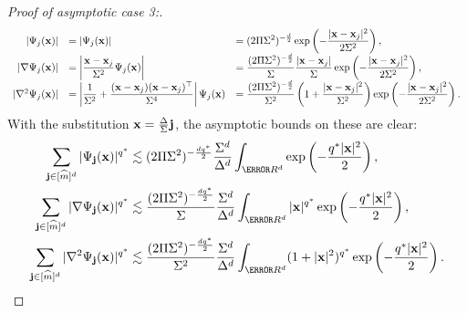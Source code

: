 \documentclass[10pt,a4paper,onecolumn]{article}
\numberwithin{equation}{section}
\renewcommand{\vec}{\mathbf}
\newcommand{\UCmath}[1]{%
	\begingroup
	\ucmathlist\uppercase\expandafter{#1}%
	\endgroup
}
\newcommand{\ucmathlist}{%
	\def\alpha{\mathrm{A}}%
	\def\beta{\mathrm{B}}%
	\let\gamma=\Gamma
	\let\delta=\Delta
	\def\epsilon{\mathrm{E}}%
	\def\varepsilon{\mathrm{E}}%
	\def\zeta{\mathrm{Z}}%
	\def\eta{\mathrm{H}}%
	\let\theta=\Theta
	\let\vartheta=\Theta
	\def\iota{\mathrm{I}}%
	\def\kappa{\mathrm{K}}%
	\let\lambda=\Lambda
	\def\mu{\mathrm{M}}%
	\def\nu{\mathrm{N}}%
	\let\xi=\Xi
	\let\pi=\Pi
	\let\varpi=\Pi
	\def\rho{\mathrm{P}}%
	\def\varrho{\mathrm{P}}%
	\let\sigma=\Sigma
	\def\tau{\mathrm{T}}%
	\let\upsilon=\Upsilon
	\let\phi=\Phi
	\let\varphi=\Phi
	\def\chi{\mathrm{X}}%
	\let\psi=\Psi
	\let\omega=\Omega
}
\newcommand{\caps}[1]{\UCmath{#1}}
\newcommand*{\vard}[1]{%
	\IfEqCase{#1}{%
		{0}{\varphi}%
		{1}{\psi}%
	}[\varphi #1]%
}
\newcommand*{\varx}[1]{%
	\IfEqCase{#1}{%
		{0}{x}%
		{1}{y}%
		{2}{z}%
		{3}{r}%
	}[x#1]%
}
\newcommand*{\Varx}[1]{\caps{\varx{#1}}}
\newcommand*{\vvarx}[1]{\vec{\varx{#1}}}\newcommand*{\vVarx}[1]{\vec{\Varx{#1}}}
\begin{document}
\begin{proof}[Proof of asymptotic case 3:]
	$$\begin{array}{rll}
			\displaystyle |\vard1_j(\vvarx0)| &\displaystyle= \left|\vard1_j(\vvarx0)\right| &\displaystyle = (2\pi\sigma^2)^{-\frac d2}\exp\left(-\frac{|\vvarx0-\vvarx0_j|^2}{2\sigma^2}\right),
			\\\displaystyle |\nabla\vard1_j(\vvarx0)| &\displaystyle= \left|\frac{\vvarx0-\vvarx0_j}{\sigma^2}\vard1_j(\vvarx0)\right| &\displaystyle = \frac{(2\pi\sigma^2)^{-\frac d2}}{\sigma}\frac{|\vvarx0-\vvarx0_j|}{\sigma}\exp\left(-\frac{|\vvarx0-\vvarx0_j|^2}{2\sigma^2}\right),
			\\|\nabla^2\vard1_j(\vvarx0)| &\displaystyle =\left|\frac1{\sigma^2} + \frac{(\vvarx0-\vvarx0_j)(\vvarx0-\vvarx0_j)^\top }{\sigma^4}\right|\vard1_j(\vvarx0) &\displaystyle = \frac{(2\pi\sigma^2)^{-\frac d2}}{\sigma^2}\left(1+\frac{|\vvarx0-\vvarx0_j|^2}{\sigma^2}\right)\exp\left(-\frac{|\vvarx0-\vvarx0_j|^2}{2\sigma^2}\right).
	\end{array}$$
	With the substitution $\vvarx0=\frac{\Delta}{\sigma}\vec j$, the asymptotic bounds on these are clear:
	\begin{align*}
		\sum_{\vec j\in[\hat m]^d} |\vard1_{\vec j}(\vvarx0)|^{q^*} &\lesssim (2\pi\sigma^2)^{-\frac{dq^*}{2}}\frac{\sigma^d}{\Delta^d}\int_{\R^d}\exp\left(-\frac{q^*|\vvarx0|^2}{2}\right),
		\\\sum_{\vec j\in[\hat m]^d} |\nabla\vard1_{\vec j}(\vvarx0)|^{q^*} &\lesssim \frac{(2\pi\sigma^2)^{-\frac{dq^*}{2}}}{\sigma}\frac{\sigma^d}{\Delta^d}\int_{\R^d}|\vvarx0|^{q^*}\exp\left(-\frac{q^*|\vvarx0|^2}{2}\right),
		\\\sum_{\vec j\in[\hat m]^d} |\nabla^2\vard1_{\vec j}(\vvarx0)|^{q^*} &\lesssim \frac{(2\pi\sigma^2)^{-\frac{dq^*}{2}}}{\sigma^2}\frac{\sigma^d}{\Delta^d}\int_{\R^d}(1+|\vvarx0|^2)^{q^*}\exp\left(-\frac{q^*|\vvarx0|^2}{2}\right).
	\end{align*}
\end{proof}
\end{document}
